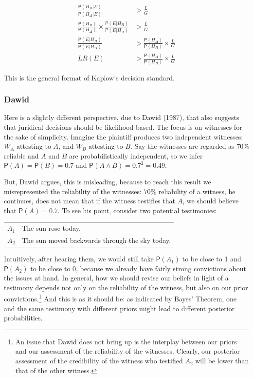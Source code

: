 \documentclass[10pt,dvipsnames,enabledeprecatedfontcommands]{scrartcl}
\newcommand{\et}{\wedge}
\newcommand{\pr}[1]{\mathsf{P}(#1)}
\begin{document}
\vspace{-6mm}

\begin{align}
\nonumber
\frac{\pr{H_\Pi \vert E}}{\pr{H_\Delta \vert E}} & > \frac{L}{G}\\
\nonumber
\frac{\pr{H_\Pi}}{\pr{H_\Delta}} \times \frac{\pr{E\vert H_\Pi}}{\pr{E\vert H_\Delta}} &> \frac{L}{G}\\
\nonumber
\frac{\pr{E\vert H_\Pi}}{\pr{E\vert H_\Delta}}  & > \frac{\pr{H_\Delta}}{\pr{H_\Pi}} \times \frac{L}{G}\\
\label{eq:Kaplow_decision2} LR(E)  & > \frac{\pr{H_\Delta}}{\pr{H_\Pi}} \times \frac{L}{G}
\end{align}

\noindent This is the general format of Kaplow's decision standard.

\hypertarget{dawid}{%
\subsubsection{Dawid}\label{dawid}}

Here is a slightly different perspective, due to Dawid (1987), that also
suggests that juridical decisions should be likelihood-based. The focus
is on witnesses for the sake of simplicity. Imagine the plaintiff
produces two independent witnesses: \(W_A\) attesting to \(A\), and
\(W_B\) attesting to \(B\). Say the witnesses are regarded as \(70\%\)
reliable and \(A\) and \(B\) are probabilistically independent, so we
infer \(\pr{A}=\pr{B}=0.7\) and \(\pr{A\et B}=0.7^2=0.49\).

But, Dawid argues, this is misleading, because to reach this result we
misrepresented the reliability of the witnesses: \(70\%\) reliability of
a witness, he continues, does not mean that if the witness testifies
that \(A\), we should believe that \(\pr{A}=0.7\). To see his point,
consider two potential testimonies:

\begin{center}
\begin{tabular}
{@{}ll@{}}
\toprule
  $A_1$ & The sun rose today. \\
   $A_2$ & The sun moved backwards through the sky today.\\
\bottomrule
\end{tabular}
\end{center}

\noindent     Intuitively, after hearing them, we would still take
\(\pr{A_1}\) to be close to 1 and \(\pr{A_2}\) to be close to 0, because
we already have fairly strong convictions about the issues at hand. In
general, how we should revise our beliefs in light of a testimony
depends not only on the reliability of the witness, but also on our
prior
convictions.\footnote{An issue that Dawid does not bring up is the interplay between our priors and our assessment of the reliability of the witnesses. Clearly, our posterior assessment of the credibility of the witness who testified $A_2$ will be lower than that of the other witness.}
And this is as it should be: as indicated by Bayes' Theorem, one and the
same testimony with different priors might lead to different posterior
probabilities.
\end{document}
